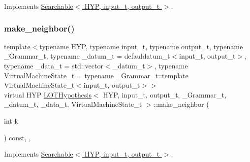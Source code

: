 Implements \hyperlink{class_searchable_a23786e95730117c3cc4b90e010494a1e}{Searchable$<$ H\+Y\+P, input\+\_\+t, output\+\_\+t $>$}.

\mbox{\label{class_l_o_t_hypothesis_a997c88cb84133efc599b9b14173aefe9}} 
\subsubsection{\texorpdfstring{make\+\_\+neighbor()}{make\_neighbor()}}
{\footnotesize\ttfamily template$<$typename H\+YP, typename input\+\_\+t, typename output\+\_\+t, typename \+\_\+\+Grammar\+\_\+t, typename \+\_\+datum\+\_\+t = defauldatum\+\_\+t$<$input\+\_\+t, output\+\_\+t$>$, typename \+\_\+data\+\_\+t = std\+::vector$<$\+\_\+datum\+\_\+t$>$, typename Virtual\+Machine\+State\+\_\+t = typename \+\_\+\+Grammar\+\_\+t\+::template Virtual\+Machine\+State\+\_\+t$<$input\+\_\+t, output\+\_\+t$>$$>$ \\
virtual H\+YP \hyperlink{class_l_o_t_hypothesis}{L\+O\+T\+Hypothesis}$<$ H\+YP, input\+\_\+t, output\+\_\+t, \+\_\+\+Grammar\+\_\+t, \+\_\+datum\+\_\+t, \+\_\+data\+\_\+t, Virtual\+Machine\+State\+\_\+t $>$\+::make\+\_\+neighbor (\begin{DoxyParamCaption}\item[{int}]{k }\end{DoxyParamCaption}) const\hspace{0.3cm}{\ttfamily [inline]}, {\ttfamily [override]}, {\ttfamily [virtual]}}



Implements \hyperlink{class_searchable_ad7fefacd3c9c2b66aa58c9d902f645cb}{Searchable$<$ H\+Y\+P, input\+\_\+t, output\+\_\+t $>$}.

\mbox{\label{class_l_o_t_hypothesis_a097cde606ec3f277fdeb92145599027f}} 
